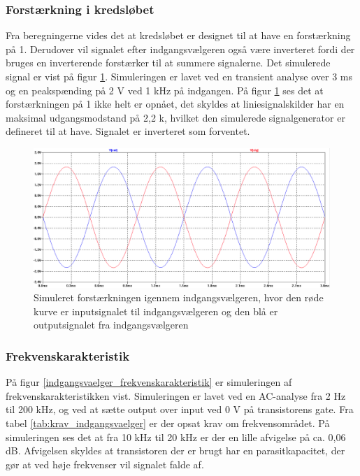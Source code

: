\subsubsection*{Forstærkning i kredsløbet}
Fra beregningerne vides det at kredsløbet er designet til at have en forstærkning på 1. Derudover vil signalet efter indgangsvælgeren også være inverteret fordi der bruges en inverterende forstærker til at summere signalerne. Det simulerede signal er vist på figur \ref{indgangsvaelger_input/output}. Simuleringen er lavet ved en transient analyse over 3 ms og en peakspænding på 2 V ved 1 kHz på indgangen. På figur \ref{indgangsvaelger_input/output} ses det at forstærkningen på 1 ikke helt er opnået, det skyldes at liniesignalskilder har en maksimal udgangsmodstand på 2,2 k\ohm, hvilket den simulerede signalgenerator er defineret til at have. Signalet er inverteret som forventet. 
\begin{figure}[h]
\centering
\includegraphics[width=\textwidth]{teknisk/indgangsvaelger/simulering/input_output.png}
\caption{Simuleret forstærkningen igennem indgangsvælgeren, hvor den røde kurve er inputsignalet til indgangsvælgeren og den blå er outputsignalet fra indgangsvælgeren}
\label{indgangsvaelger_input/output}
\end{figure}

\subsubsection*{Frekvenskarakteristik}
På figur \ref{indgangsvaelger_frekvenskarakteristik} er simuleringen af frekvenskarakteristikken vist. Simuleringen er lavet ved en AC-analyse fra 2 Hz til 200 kHz, og ved at sætte output over input ved 0 V på transistorens gate. Fra tabel \ref{tab:krav_indgangsvaelger} er der opsat krav om frekvensområdet. På simuleringen ses det at fra 10 kHz til 20 kHz er der en lille afvigelse på ca. 0,06 dB. Afvigelsen skyldes at transistoren der er brugt har en parasitkapacitet, der gør at ved høje frekvenser vil signalet falde af.

